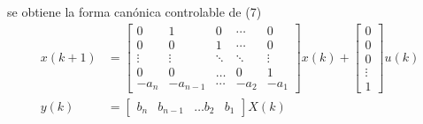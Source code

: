 se obtiene la forma canónica controlable de (7)
\[
    \begin{split}
        x(k+1) & = 
        \begin{bmatrix}
            0 & 1 & 0 & \cdots & 0 \\
            0 & 0 & 1 & \cdots & 0 \\
            \vdots & \vdots & \ddots & \ddots & \vdots \\
            0 & 0 & \ldots & 0 & 1 \\
            -a_{n} & -a_{n-1} & \cdots & -a_{2} & -a_{1}
        \end{bmatrix}x(k) +
        \begin{bmatrix}
            0 \\ 0 \\ 0 \\ \vdots \\ 1
        \end{bmatrix}u(k) \\
        y(k) & = 
        \begin{bmatrix}
            b_{n} & b_{n-1} & \ldots b_{2} & b_{1}    
        \end{bmatrix} X(k)
    \end{split}
\]
